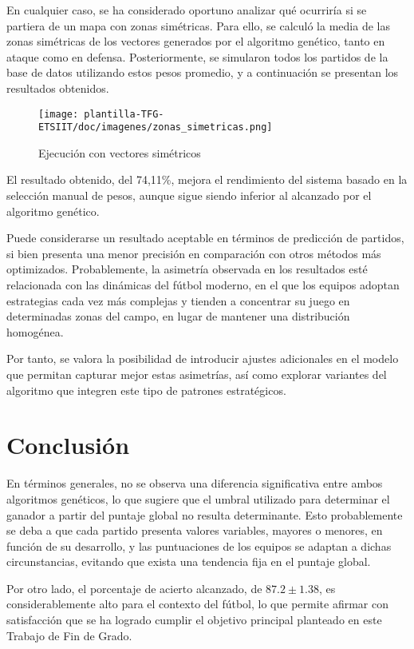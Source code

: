 En cualquier caso, se ha considerado oportuno analizar qué ocurriría si se partiera de un mapa con zonas simétricas. Para ello, se calculó la media de las zonas simétricas de los vectores generados por el algoritmo genético, tanto en ataque como en defensa. Posteriormente, se simularon todos los partidos de la base de datos utilizando estos pesos promedio, y a continuación se presentan los resultados obtenidos.

\begin{figure}[H]
    \centering
    \texttt{[image: plantilla-TFG-ETSIIT/doc/imagenes/zonas\_simetricas.png]}
    \caption{Ejecución con vectores simétricos}
    \label{fig:etiqueta-imagen}
\end{figure}

El resultado obtenido, del 74,11\%, mejora el rendimiento del sistema basado en la selección manual de pesos, aunque sigue siendo inferior al alcanzado por el algoritmo genético.

Puede considerarse un resultado aceptable en términos de predicción de partidos, si bien presenta una menor precisión en comparación con otros métodos más optimizados. Probablemente, la asimetría observada en los resultados esté relacionada con las dinámicas del fútbol moderno, en el que los equipos adoptan estrategias cada vez más complejas y tienden a concentrar su juego en determinadas zonas del campo, en lugar de mantener una distribución homogénea.

Por tanto, se valora la posibilidad de introducir ajustes adicionales en el modelo que permitan capturar mejor estas asimetrías, así como explorar variantes del algoritmo que integren este tipo de patrones estratégicos.

\section{Conclusión}
En términos generales, no se observa una diferencia significativa entre ambos algoritmos genéticos, lo que sugiere que el umbral utilizado para determinar el ganador a partir del puntaje global no resulta determinante. Esto probablemente se deba a que cada partido presenta valores variables, mayores o menores, en función de su desarrollo, y las puntuaciones de los equipos se adaptan a dichas circunstancias, evitando que exista una tendencia fija en el puntaje global.

Por otro lado, el porcentaje de acierto alcanzado, de $87.2 \pm 1.38$, es considerablemente alto para el contexto del fútbol, lo que permite afirmar con satisfacción que se ha logrado cumplir el objetivo principal planteado en este Trabajo de Fin de Grado.